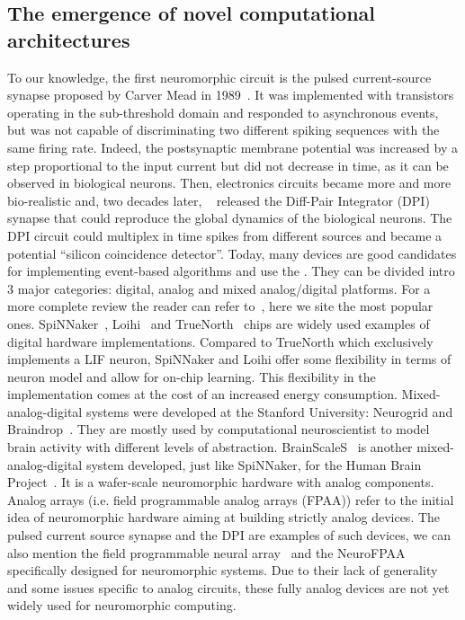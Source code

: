 \documentclass[brainsci, %
               review,submit,pdftex,moreauthors
               ]{Definitions/mdpi}
\begin{document}
\subsection{The emergence of novel computational architectures}
%
To our knowledge, the first neuromorphic circuit is the pulsed current-source synapse proposed by Carver Mead in 1989~\citep{mead_analog_1989}. It was implemented with transistors operating in the sub-threshold domain and responded to asynchronous events, but was not capable of discriminating two different spiking sequences with the same firing rate. Indeed, the postsynaptic membrane potential was increased by a step proportional to the input current but did not decrease in time, as it can be observed in biological neurons. Then, electronics circuits became more and more bio-realistic and, two decades later, ~\citep{bartolozzi_synaptic_2007} released the Diff-Pair Integrator (DPI) synapse that could reproduce the global dynamics of the biological neurons. The DPI circuit could multiplex in time spikes from different sources and became a potential  ``silicon coincidence detector''. Today, many devices are good candidates for implementing event-based algorithms and use the . They can be divided intro 3 major categories: digital, analog and mixed analog/digital platforms. For a more complete review the reader can refer to~\citep{schuman_survey_2017}, here we site the most popular ones. SpiNNaker~\citep{furber_overview_2013, furber_spinnaker_2020}, Loihi~\citep{davies_loihi_2018} and TrueNorth~\citep{merolla_million_2014} chips are widely used examples of digital hardware implementations. Compared to TrueNorth which exclusively implements a LIF neuron, SpiNNaker and Loihi offer some flexibility in terms of neuron model and allow for on-chip learning. This flexibility in the implementation comes at the cost of an increased energy consumption. Mixed-analog-digital systems were developed at the Stanford University: Neurogrid and Braindrop~\citep{benjamin_neurogrid_2014, neckar_braindrop_2019}. They are mostly used by computational neuroscientist to model brain activity with different levels of abstraction. BrainScaleS~\citep{schemmel_wafer-scale_2010} is another mixed-analog-digital system developed, just like SpiNNaker, for the Human Brain Project~\citep{markram_introducing_2011}. It is a wafer-scale neuromorphic hardware with analog components. Analog arrays (i.e. field programmable analog arrays (FPAA)) refer to the initial idea of neuromorphic hardware aiming at building strictly analog devices. The pulsed current source synapse and the DPI are examples of such devices, we can also mention the field programmable neural array~\citep{farquhar_field_2006} and the NeuroFPAA~\citep{cheng_fpaa_2009} specifically designed for neuromorphic systems. Due to their lack of generality and some issues specific to analog circuits, these fully analog devices are not yet widely used for neuromorphic computing. 
\end{document}
